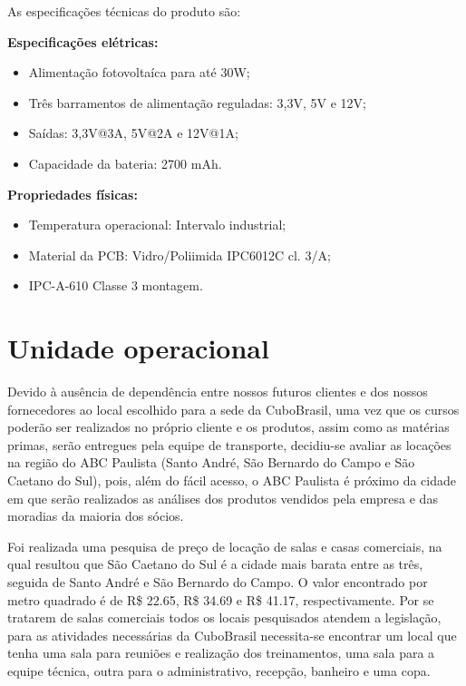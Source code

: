 \documentclass[
	12pt,				%
	openright,			%
	oneside,			%
	a4paper,			%
	english,			%
	french,				%
	spanish,			%
	brazil				%
	]{abntex2}
\begin{document}
	As especificações técnicas do produto são:
	
	\textbf{Especificações elétricas:}
	
	\begin{itemize}
		\item Alimentação fotovoltaíca para até 30W;
		\item Três barramentos de alimentação reguladas: 3,3V, 5V e 12V;
		\item Saídas: 3,3V@3A, 5V@2A e 12V@1A;
		\item Capacidade da bateria: 2700 mAh.
	\end{itemize}
	
	\textbf{Propriedades físicas:}
	
	\begin{itemize}
		\item Temperatura operacional: Intervalo industrial;
		\item Material da PCB: Vidro/Poliimida IPC6012C cl. 3/A;
		\item IPC-A-610 Classe 3 montagem.
	\end{itemize}
	
\section[Unidade operacional]{Unidade operacional}
	
	Devido à ausência de dependência entre nossos futuros clientes e dos nossos fornecedores ao local escolhido para a sede da CuboBrasil, uma vez que os cursos poderão ser realizados no próprio cliente e os produtos, assim como as matérias primas, serão entregues pela equipe de transporte, decidiu-se avaliar as locações na região do ABC Paulista (Santo André, São Bernardo do Campo e São Caetano do Sul), pois, além do fácil acesso, o ABC Paulista é próximo da cidade em que serão realizados as análises dos produtos vendidos pela empresa e das moradias da maioria dos sócios.
	
	Foi realizada uma pesquisa de preço de locação de salas e casas comerciais, na qual resultou que São Caetano do Sul é a cidade mais barata entre as três, seguida de Santo André e São Bernardo do Campo. O valor encontrado por metro quadrado é de R\$ 22.65, R\$ 34.69 e R\$ 41.17, respectivamente. Por se tratarem de salas comerciais todos os locais pesquisados atendem a legislação, para as atividades necessárias da CuboBrasil necessita-se encontrar um local que tenha uma sala para reuniões e realização dos treinamentos, uma sala para a equipe técnica, outra para o administrativo, recepção, banheiro e uma copa.
	
\end{document}

